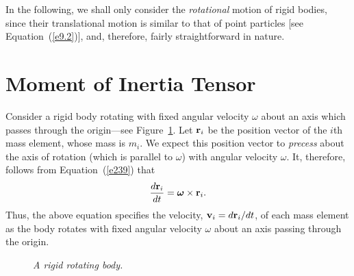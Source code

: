 In the following, we shall only consider the {\em rotational}\/ motion of rigid bodies, since their translational motion is similar to that
of  point particles [see Equation~(\ref{e9.2})], and, therefore, fairly straightforward
in nature.

\section{Moment of Inertia Tensor}\label{mom}
Consider a rigid body rotating with fixed angular velocity \mbox{\boldmath$\omega$} about
an axis which passes through the origin---see Figure~\ref{rig}.
Let ${\bf r}_i$ be the position vector of the $i$th mass element, whose mass
is $m_i$.
We expect this position vector to {\em precess}\/ about the axis of rotation
(which is parallel to \mbox{\boldmath$\omega$})
with angular velocity $\omega$. It, therefore, follows from Equation~(\ref{e239})
that
\begin{equation}\label{e9.4}
\frac{d{\bf r}_i}{dt} =  \mbox{\boldmath$\omega$}\times {\bf r}_i.
\end{equation}
Thus, the above equation  specifies the velocity, ${\bf v}_i = d{\bf r}_i/dt$, 
of each mass element as the body rotates  with fixed angular velocity \mbox{\boldmath$\omega$} about
an axis passing  through the origin.

\begin{figure}
\epsfysize=2.5in
\centerline{}
\caption{\em A rigid rotating body.}\label{rig}
\end{figure}


